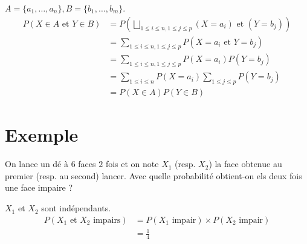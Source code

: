 \documentclass[../main.tex]{subfiles}
\begin{document}
\noindent $A = \{ a_1, \ldots, a_n \}, B = \{ b_1, \ldots, b_m \}$.
\begin{align*}
    P(X\in A \text{ et } Y\in B) &= P \left( \bigsqcup_{1\leq i\leq n, 1\leq j\leq p} (X = a_i) \text{ et } (Y = b_j) \right) \\
    &= \sum_{1\leq i\leq n, 1\leq j\leq p} P(X = a_i \text{ et } Y = b_j) \\
    &= \sum_{1\leq i\leq n, 1\leq j\leq p} P(X = a_i) P(Y = b_j) \\
    &= \sum_{1\leq i\leq n} P(X = a_i) \sum_{1\leq j\leq p} P(Y = b_j) \\
    &= P(X \in A) P(Y \in B)
\end{align*}

\section{Exemple}
\begin{tcolorbox}[title=Exemple 32.51, title filled=false, colframe=darkgreen, colback=darkgreen!10!white]
    On lance un dé à $6$ faces $2$ fois et on note $X_1$ (resp. $X_2$) la face obtenue au premier (resp. au second) lancer. Avec quelle probabilité obtient-on els deux fois une face impaire ?
\end{tcolorbox}

\noindent $X_1$ et $X_2$ sont indépendants. \\
\begin{align*}
    P(X_1 \text{ et } X_2 \text{ impairs}) &= P(X_1 \text{ impair}) \times P(X_2 \text{ impair}) \\
    &= \frac{1}{4}
\end{align*}
\end{document}
